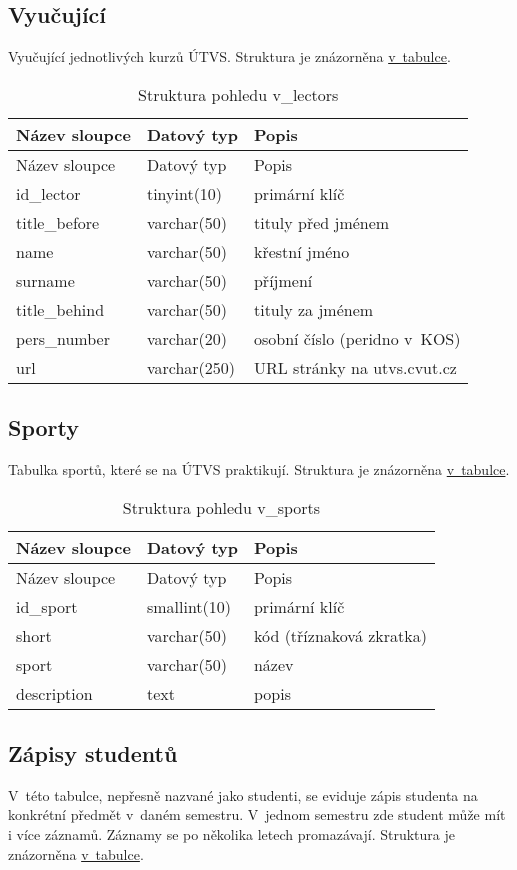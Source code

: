 \subsection{Vyučující}\label{vyuux10dujuxedcuxed}

Vyučující jednotlivých kurzů ÚTVS. Struktura je znázorněna \protect\hyperlink{tab:lectors}{v~tabulce}.

\begin{longtable}[]{@{}lll@{}}
\caption{Struktura pohledu v\_lectors \label{tab:lectors}}\tabularnewline
\toprule
Název sloupce & Datový typ & Popis\tabularnewline
\midrule
\endfirsthead
\toprule
Název sloupce & Datový typ & Popis\tabularnewline
\midrule
\endhead
id\_lector & tinyint(10) & primární klíč\tabularnewline
title\_before & varchar(50) & tituly před jménem\tabularnewline
name & varchar(50) & křestní jméno\tabularnewline
surname & varchar(50) & příjmení\tabularnewline
title\_behind & varchar(50) & tituly za jménem\tabularnewline
pers\_number & varchar(20) & osobní číslo (peridno v~KOS)\tabularnewline
url & varchar(250) & URL stránky na utvs.cvut.cz\tabularnewline
\bottomrule
\end{longtable}

\subsection{Sporty}\label{sporty}

Tabulka sportů, které se na ÚTVS praktikují. Struktura je znázorněna \protect\hyperlink{tab:sports}{v~tabulce}.

\begin{longtable}[]{@{}lll@{}}
\caption{Struktura pohledu v\_sports \label{tab:sports}}\tabularnewline
\toprule
Název sloupce & Datový typ & Popis\tabularnewline
\midrule
\endfirsthead
\toprule
Název sloupce & Datový typ & Popis\tabularnewline
\midrule
\endhead
id\_sport & smallint(10) & primární klíč\tabularnewline
short & varchar(50) & kód (tříznaková zkratka)\tabularnewline
sport & varchar(50) & název\tabularnewline
description & text & popis\tabularnewline
\bottomrule
\end{longtable}

\subsection{Zápisy studentů}\label{zuxe1pisy-studentux16f}

V~této tabulce, nepřesně nazvané jako studenti, se eviduje zápis studenta na konkrétní předmět v~daném semestru. V~jednom semestru zde student může mít i více záznamů. Záznamy se po několika letech promazávají. Struktura je znázorněna \protect\hyperlink{tab:students}{v~tabulce}.

